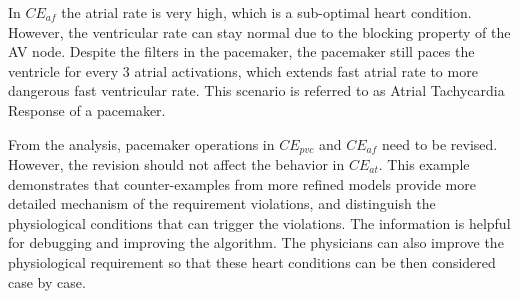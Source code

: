 In $CE_{af}$ the atrial rate is very high, which is a sub-optimal heart condition. 
However, the ventricular rate can stay normal due to the blocking property of the AV node. 
Despite the filters in the pacemaker, the pacemaker still paces the ventricle for every 3 atrial activations, which extends fast atrial rate to more dangerous fast ventricular rate. 
This scenario is referred to as Atrial Tachycardia Response of a pacemaker. 

From the analysis, pacemaker operations in $CE_{pvc}$ and $CE_{af}$ need to be revised. However, the revision should not affect the behavior in $CE_{at}$. This example demonstrates that counter-examples from more refined models provide more detailed mechanism of the requirement violations, and distinguish the physiological conditions that can trigger the violations. The information is helpful for debugging and improving the algorithm. The physicians can also improve the physiological requirement so that these heart conditions can be then considered case by case. %
%
 




